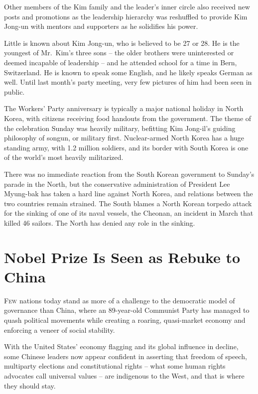 ﻿\documentclass[12pt]{article}
\begin{document}
Other members of the Kim family and the leader's inner circle also received new posts and promotions
as the leadership hierarchy was reshuffled to provide Kim Jong-un with mentors and supporters as he
solidifies his power.

Little is known about Kim Jong-un, who is believed to be 27 or 28. He is the youngest of Mr.~Kim's
three sons -- the older brothers were uninterested or deemed incapable of leadership -- and he
attended school for a time in Bern, Switzerland. He is known to speak some English, and he likely
speaks German as well. Until last month's party meeting, very few pictures of him had been seen in
public.

The Workers' Party anniversary is typically a major national holiday in North Korea, with citizens
receiving food handouts from the government. The theme of the celebration Sunday was heavily
military, befitting Kim Jong-il's guiding philosophy of songun, or military first. Nuclear-armed
North Korea has a huge standing army, with 1.2 million soldiers, and its border with South Korea is
one of the world's most heavily militarized.

There was no immediate reaction from the South Korean government to Sunday's parade in the North,
but the conservative administration of President Lee Myung-bak has taken a hard line against North
Korea, and relations between the two countries remain strained. The South blames a North Korean
torpedo attack for the sinking of one of its naval vessels, the Cheonan, an incident in March that
killed 46 sailors. The North has denied any role in the sinking.

\section{Nobel Prize Is Seen as Rebuke to China}

\lettrine{F}{ew} nations today stand as more of a challenge to the
democratic model of governance than China, where an 89-year-old Communist Party has managed to quash
political movements while creating a roaring, quasi-market economy and enforcing a veneer of social
stability.

With the United States' economy flagging and its global influence in decline, some Chinese leaders
now appear confident in asserting that freedom of speech, multiparty elections and constitutional
rights -- what some human rights advocates call universal values -- are indigenous to the West, and
that is where they should stay.
\end{document}
